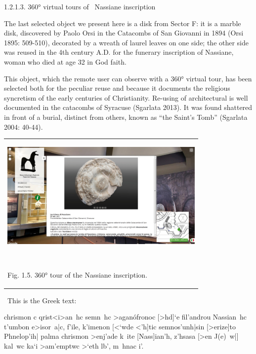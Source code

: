 \documentclass[amsthm,ebook]{saparticle}
\begin{document}
\bigskip

1.2.1.3. 360° virtual tours of \ Nassiane inscription

The last selected object we present here is a disk from Sector F: it is a marble disk, discovered by Paolo Orsi in the
Catacombs of San Giovanni in 1894 (Orsi 1895: 509-510), decorated by a wreath of laurel leaves on one side; the other
side was reused in the 4th century A.D. for the funerary inscription of Nassiane, woman who died at age 32 in God
faith. 

This object, which the remote user can observe with a 360° virtual tour, has been selected both for the peculiar reuse
and because it documents the religious syncretism of the early centuries of Christianity. Re-using of architectural is
well documented in the catacombs of Syracuse (Sgarlata 2013). It was found shattered in front of a burial, distinct
from others, known as “the Saint's Tomb” (Sgarlata 2004: 40-44). 


\bigskip

\begin{flushleft}
\tablefirsthead{}
\tablehead{}
\tabletail{}
\tablelasttail{}
\begin{supertabular}{m{10.681cm}}
{\centering  \includegraphics[width=10.029cm,height=5.225cm]{EAGLE2016BONACINIPilotprojectatPaoloOrsiMuseum-img005.jpg}
\par}

~

Fig. 1.5. 360° tour of the Nassiane inscription. \\
\end{supertabular}
\end{flushleft}
\ This is the Greek text: 


\bigskip

chrismon \textgreek{c qrist{\textless}i{\textgreater}an~hc semn~hc >aganófronoc [>hd]`e fil'androu
}N\textgreek{assian~hc t'umbon e>isor~a|c, f'ile, k'imenon [<`wde <'h]tic semnos'unh|sin [>erize]to Phnelop'ih| }palma
chrismon \textgreek{>enj'ade k~ite [}N\textgreek{ass]ian'h, z'hsasa [>en J(e)~w|] kal~wc ka`i >am'emptwc >`eth
lb}\textgreek{', }\textgreek{m}\textgreek{~hnac i'.}
\end{document}
